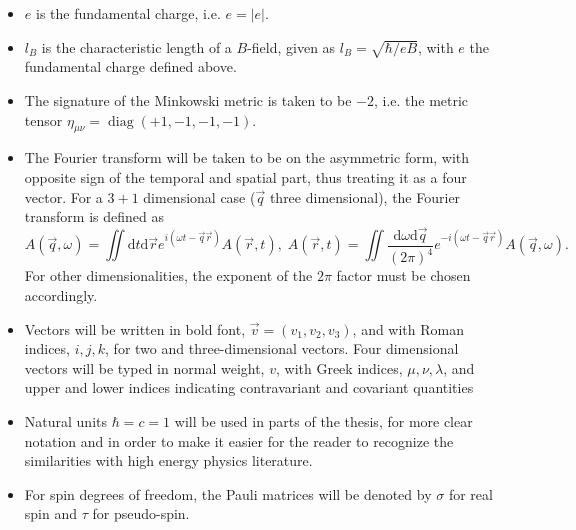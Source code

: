 \begin{itemize}
\item $e$ is the fundamental charge, i.e. $e = |e|$.
\item $l_B$ is the characteristic length of a $B$-field, given as $l_B= \sqrt{\hbar /eB}$, with $e$ the fundamental charge defined above.
\item The signature of the Minkowski metric is taken to be $-2$, i.e. the metric tensor $\eta _{\mu \nu } = \operatorname{diag} (+1, -1,-1,-1)$.
\item The Fourier transform will be taken to be on the asymmetric form, with opposite sign of the temporal and spatial part, thus treating it as a four vector.
  For a $3+1$ dimensional case ($\vec{q}$ three dimensional), the Fourier transform is defined as
  \begin{equation}
    \label{eq:define-fourier}
    A(\vec{q}, \omega ) =\!\!
    \iint \mathrm{d}t \mathrm{d} \vec{r}
    e^{i(\omega  t - \vec{q} \vec{r} )}
    A(\vec{r}, t),
    \;
    A(\vec{r}, t) =\!\!
    \iint 
    \frac{\mathrm{d}\omega  \mathrm{d} \vec{q}}{(2\pi )^4}
    e^{-i(\omega  t - \vec{q} \vec{r} )}
    A(\vec{q}, \omega).
  \end{equation}
  For other dimensionalities, the exponent of the $2\pi $ factor must be chosen accordingly.

\item Vectors will be written in bold font, $\vec{v} = (v_1, v_2, v_3)$, and with Roman indices, $i, j, k$, for two and three-dimensional vectors.
  Four dimensional vectors will be typed in normal weight, $v$, with Greek indices, $\mu ,  \nu , \lambda $, and upper and lower indices indicating contravariant and covariant quantities
\item Natural units \( \hbar = c = 1 \) will be used in parts of the thesis, for more clear notation and in order to make it easier for the reader to recognize the similarities with high energy physics literature.
\item For spin degrees of freedom, the Pauli matrices
  will be denoted by $\sigma $ for real spin and $\tau $ for pseudo-spin.
  

\end{itemize}
